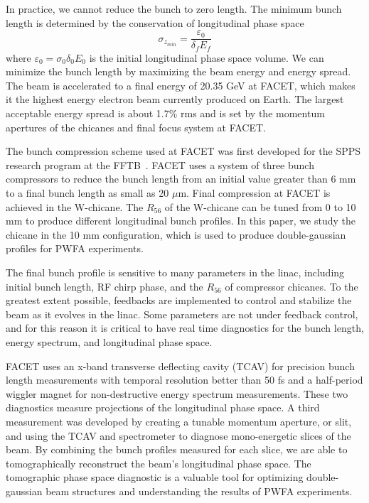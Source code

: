 \documentclass[%
twocolumn,
showpacs,preprintnumbers,
 aps,
prstab,
]{revtex4-1}
\begin{document}
In practice, we cannot reduce the bunch to zero length. The minimum bunch length is determined by the conservation of longitudinal phase space
\begin{equation}\label{cons}
 \sigma_{z_{min}} = \frac{\varepsilon_0}{\delta_f E_f}
\end{equation}
where $\varepsilon_0 = \sigma_0\delta_0 E_0$ is the initial longitudinal phase space volume. We can minimize the bunch length by maximizing the beam energy and energy spread. The beam is accelerated to a final energy of 20.35 GeV at FACET, which makes it the highest energy electron beam currently produced on Earth. The largest acceptable energy spread is about 1.7\% rms and is set by the momentum apertures of the chicanes and final focus system at FACET.

The bunch compression scheme used at FACET was first developed for the SPPS research program at the FFTB~\cite{pe_spps}. FACET uses a system of three bunch compressors to reduce the bunch length from an initial value greater than 6 mm to a final bunch length as small as 20 $\mu$m. Final compression at FACET is achieved in the W-chicane. The $R_{56}$ of the W-chicane can be tuned from 0 to 10 mm to produce different longitudinal bunch profiles. In this paper, we study the chicane in the 10 mm configuration, which is used to produce double-gaussian profiles for PWFA experiments.

The final bunch profile is sensitive to many parameters in the linac, including initial bunch length, RF chirp phase, and the $R_{56}$ of compressor chicanes. To the greatest extent possible, feedbacks are implemented to control and stabilize the beam as it evolves in the linac. Some parameters are not under feedback control, and for this reason it is critical to have real time diagnostics for the bunch length, energy spectrum, and longitudinal phase space.

FACET uses an x-band transverse deflecting cavity (TCAV) for precision bunch length measurements with temporal resolution better than 50 fs and a half-period wiggler magnet for non-destructive energy spectrum measurements. These two diagnostics measure projections of the longitudinal phase space. A third measurement was developed by creating a tunable momentum aperture, or slit, and using the TCAV and spectrometer to diagnose mono-energetic slices of the beam. By combining the bunch profiles measured for each slice, we are able to tomographically reconstruct the beam's longitudinal phase space. The tomographic phase space diagnostic is a valuable tool for optimizing double-gaussian beam structures and understanding the results of PWFA experiments.
\end{document}
